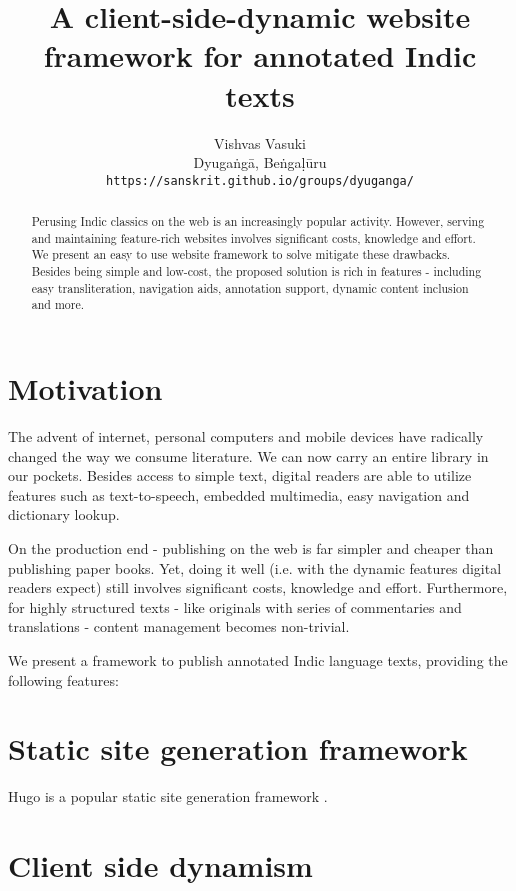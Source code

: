 \documentclass[11pt]{article}
\title{A client-side-dynamic website framework for annotated Indic texts}
\author{
  Vishvas Vasuki \\
  Dyugaṅgā, Beṅgaḷūru \\
  {\tt https://sanskrit.github.io/groups/dyuganga/}
\\}
\date{}
\begin{document}
\maketitle
\begin{abstract}
Perusing Indic classics on the web is an increasingly popular activity. However, serving and maintaining feature-rich websites involves significant costs, knowledge and effort. We present an easy to use website framework to solve mitigate these drawbacks. Besides being simple and low-cost, the proposed solution is rich in features - including easy transliteration, navigation aids, annotation support, dynamic content inclusion and more.
\end{abstract}

\section{Motivation}
The advent of internet, personal computers and mobile devices have radically changed the way we consume literature. We can now carry an entire library in our pockets. Besides access to simple text, digital readers are able to utilize features such as text-to-speech, embedded multimedia, easy navigation and dictionary lookup. 

On the production end - publishing on the web is far simpler and cheaper than publishing paper books. Yet, doing it well (i.e. with the dynamic features digital readers expect) still involves significant costs, knowledge and effort. Furthermore, for highly structured texts - like originals with series of commentaries and translations - content management becomes non-trivial.

We present a framework to publish annotated Indic language texts, providing the following features:



\section{Static site generation framework}
Hugo is a popular static site generation framework \cite{hugo}.

\section{Client side dynamism}




\end{document}
